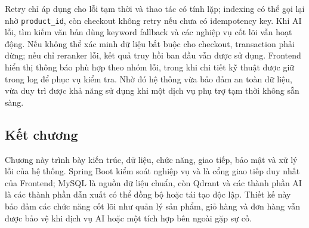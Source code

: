 Retry chỉ áp dụng cho lỗi tạm thời và thao tác có tính lặp; indexing có thể gọi lại
nhờ \texttt{product\_id}, còn checkout không retry nếu chưa có idempotency key. Khi
AI lỗi, tìm kiếm văn bản dùng keyword fallback và các nghiệp vụ cốt lõi vẫn hoạt
động. Nếu không thể xác minh dữ liệu bắt buộc cho checkout, transaction phải dừng;
nếu chỉ reranker lỗi, kết quả truy hồi ban đầu vẫn được sử dụng. Frontend hiển thị
thông báo phù hợp theo nhóm lỗi, trong khi chi tiết kỹ thuật được giữ trong log để
phục vụ kiểm tra. Nhờ đó hệ thống vừa bảo đảm an toàn dữ liệu, vừa duy trì được
khả năng sử dụng khi một dịch vụ phụ trợ tạm thời không sẵn sàng.

\subsection*{Kết chương}

Chương này trình bày kiến trúc, dữ liệu, chức năng, giao tiếp, bảo mật và xử lý lỗi
của hệ thống. Spring Boot kiểm soát nghiệp vụ và là cổng giao tiếp duy nhất của
Frontend; MySQL là nguồn dữ liệu chuẩn, còn Qdrant và các thành phần AI là các
thành phần dẫn xuất có thể đồng bộ hoặc tái tạo độc lập. Thiết kế này bảo đảm các
chức năng cốt lõi như quản lý sản phẩm, giỏ hàng và đơn hàng vẫn được bảo vệ khi
dịch vụ AI hoặc một tích hợp bên ngoài gặp sự cố.
